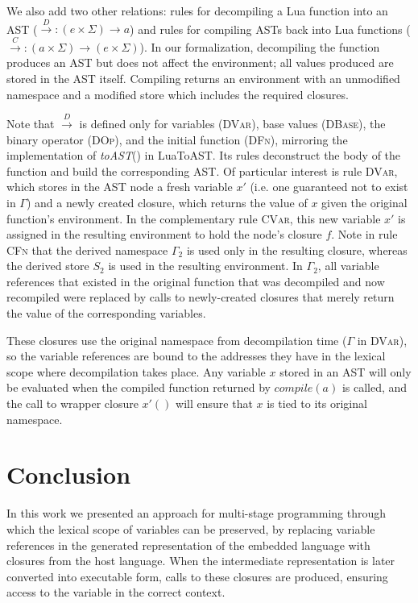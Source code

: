 \documentclass[english]{llncs}
\begin{document}
We also add two other relations: rules for decompiling a Lua function
into an AST ($\overset{D}{\rightarrow}:(e\times\Sigma)\rightarrow a$)
and rules for compiling ASTs back into Lua functions ($\overset{C}{\rightarrow}:(a\times\Sigma)\rightarrow(e\times\Sigma)$).
In our formalization, decompiling the function produces an AST but
does not affect the environment; all values produced are stored in
the AST itself. Compiling returns an environment with an unmodified
namespace and a modified store which includes the required closures. 

Note that $\overset{D}{\rightarrow}$ is defined only for variables
(\textsc{DVar}), base values (\textsc{DBase}), the binary operator
(\textsc{DOp}), and the initial function (\textsc{DFn}), mirroring
the implementation of \emph{toAST}() in LuaToAST. Its rules deconstruct
the body of the function and build the corresponding AST. Of particular
interest is rule \textsc{DVar}, which stores in the AST node a fresh
variable $x'$ (i.e. one guaranteed not to exist in $\Gamma$) and
a newly created closure, which returns the value of $x$ given the
original function's environment. In the complementary rule \textsc{CVar},
this new variable $x'$ is assigned in the resulting environment to
hold the node's closure $f$. Note in rule \textsc{CFn} that the derived
namespace $\Gamma_{2}$ is used only in the resulting closure, whereas
the derived store $S_{2}$ is used in the resulting environment. In
$\Gamma_{2}$, all variable references that existed in the original
function that was decompiled and now recompiled were replaced by calls
to newly-created closures that merely return the value of the corresponding
variables.

These closures use the original namespace from decompilation time
($\Gamma$ in \textsc{DVar}), so the variable references are bound
to the addresses they have in the lexical scope where decompilation
takes place. Any variable $x$ stored in an AST will only be evaluated
when the compiled function returned by $compile(a)$ is called, and
the call to wrapper closure $x'()$ will ensure that $x$ is tied
to its original namespace.

\section{Conclusion}

In this work we presented an approach for multi-stage programming through
which the lexical scope of variables can be preserved, by replacing
variable references in the generated representation of the embedded language
with closures from the host language. When the intermediate representation
is later converted into executable form, calls to these closures are
produced, ensuring access to the variable in the correct context.
\end{document}
